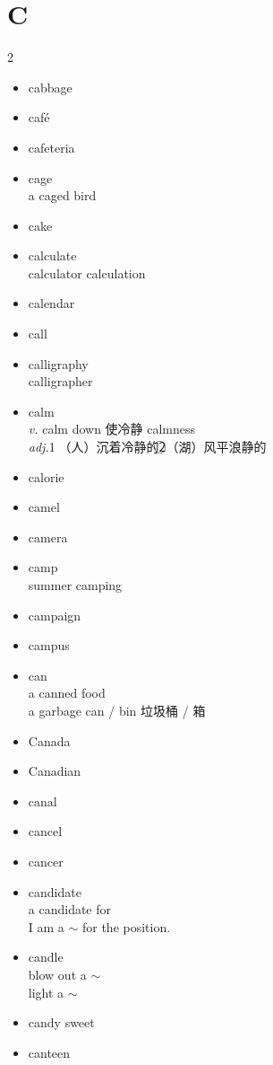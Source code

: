 \documentclass[../../book.tex]{subfiles}
\begin{document}
\section{C}
\raggedcolumns
\begin{multicols}{2}
\begin{itemize}
\item[-] cabbage
\item[-] caf\'e
\item[-] cafeteria
\item[-] cage
\\a caged bird
\item[-] cake
\item[-] calculate
\\calculator calculation
\item[-] calendar
\item[-] call
\item[-] calligraphy
\\calligrapher
\item[-] calm
\\\emph{v.} calm down 使冷静 \phantom{a} calmness
\\\emph{adj.}\textcircled{1}（人）沉着冷静的\textcircled{2}（湖）风平浪静的
\item[-] calorie
\item[-] camel
\item[-] camera
\item[-] camp
\\summer camping
\item[-] campaign
\item[-] campus
\item[-] can
\\a canned food
\\a garbage can / bin 垃圾桶 / 箱
\item[-] Canada
\item[-] Canadian
\item[-] canal
\item[-] cancel
\item[-] cancer
\item[-] candidate
\\a candidate for
\\I am a $\sim$ for the position.
\item[-] candle
\\blow out a $\sim$
\\light a $\sim$
\item[-] candy \phantom{a} sweet
\item[-] canteen

\end{itemize}
\end{multicols}
\end{document}
